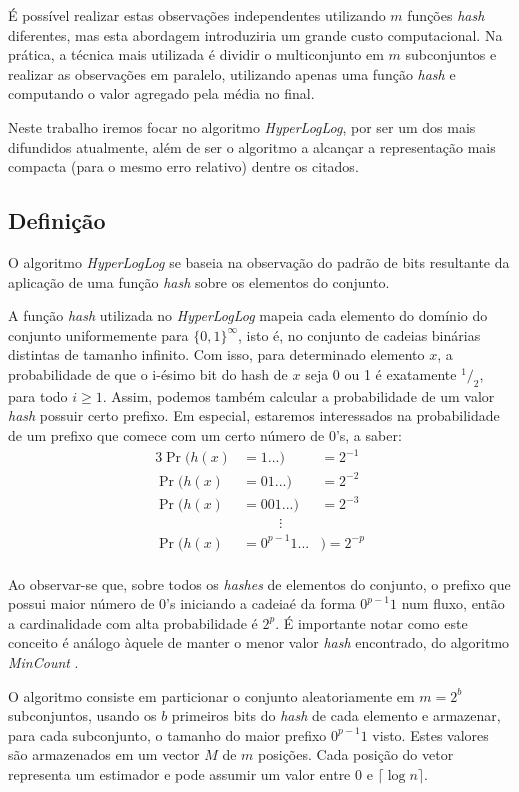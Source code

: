 É possível realizar estas observações independentes utilizando $m$ funções \emph{hash} diferentes, mas esta abordagem introduziria um grande custo computacional. Na prática, a técnica mais utilizada é dividir o multiconjunto em $m$ subconjuntos e realizar as observações em paralelo, utilizando apenas uma função \emph{hash} e computando o valor agregado pela média no final.

Neste trabalho iremos focar no algoritmo \emph{HyperLogLog}, por ser um dos mais difundidos atualmente, além de ser o algoritmo a alcançar a representação mais compacta (para o mesmo erro relativo) dentre os citados.

\subsection{Definição}

O algoritmo \emph{HyperLogLog} se baseia na observação do padrão de bits resultante da aplicação de uma função \emph{hash} sobre os elementos do conjunto. 

A função \emph{hash} utilizada no \emph{HyperLogLog} mapeia cada elemento do domínio do conjunto uniformemente para $\{0, 1\}^\infty$, isto é, no conjunto de cadeias binárias distintas de tamanho infinito. Com isso, para determinado elemento $x$, a probabilidade de que o i-ésimo bit do hash de $x$ seja 0 ou 1 é exatamente $^1/_2$, para todo $i \geq 1$. Assim, podemos também calcular a probabilidade de um valor \emph{hash} possuir certo prefixo. Em especial, estaremos interessados na probabilidade de um prefixo que comece com um certo número de 0's, a saber:
\begin{alignat*}{3}
\Pr(h(x) &= 1...) &= 2^{-1} \\
\Pr(h(x) &= 01...) &= 2^{-2} \\
\Pr(h(x) &= 001...) &= 2^{-3} \\
& \phantom{aaaaa}\vdots \\
\Pr(h(x) &= 0^{p-1}1...&) = 2^{-p} \\
\end{alignat*}

Ao observar-se que, sobre todos os \emph{hashes} de elementos do conjunto, o prefixo que possui maior número de 0's iniciando a cadeiaé da forma $0^{p-1}1$ num fluxo, então a cardinalidade com alta probabilidade é $2^p$. É importante notar como este conceito é análogo àquele de manter o menor valor \emph{hash} encontrado, do algoritmo \emph{MinCount}  \cite{giroire2009order}.

O algoritmo consiste em particionar o conjunto aleatoriamente em $m = 2^b$ subconjuntos, usando os $b$ primeiros bits do \emph{hash} de cada elemento e armazenar, para cada subconjunto, o tamanho do maior prefixo $0^{p-1}1$ visto. Estes valores são armazenados em um vector $M$ de $m$ posições. Cada posição do vetor representa um estimador e pode assumir um valor entre $0$ e $\lceil \log n \rceil$.

